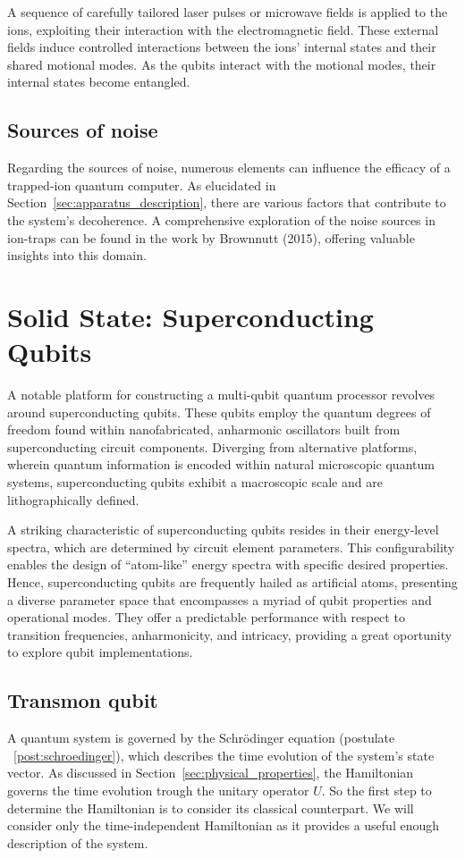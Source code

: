 \documentclass[
  journal=largetwo,
  year=2023,
]{cup-journal}
\begin{document}
A sequence of carefully tailored laser pulses or microwave fields is applied to the ions, exploiting their interaction with the electromagnetic field. These external fields induce controlled interactions between the ions' internal states and their shared motional modes.
As the qubits interact with the motional modes, their internal states become entangled.

\subsection{Sources of noise}

Regarding the sources of noise, numerous elements can influence the efficacy of a trapped-ion quantum computer. As elucidated in Section~\ref{sec:apparatus_description}, there are various factors that contribute to the system's decoherence. A comprehensive exploration of the noise sources in ion-traps can be found in the work by Brownnutt (2015)\autocite{brownnutt_2015_iontrap}, offering valuable insights into this domain.

\section{Solid State: Superconducting Qubits}
\label{cap:superconductor}

A notable platform for constructing a multi-qubit quantum processor revolves around superconducting qubits. These qubits employ the quantum degrees of freedom found within nanofabricated, anharmonic oscillators built from superconducting circuit components. Diverging from alternative platforms, wherein quantum information is encoded within natural microscopic quantum systems, superconducting qubits exhibit a macroscopic scale and are lithographically defined.

A striking characteristic of superconducting qubits resides in their energy-level spectra, which are determined by circuit element parameters. This configurability enables the design of ``atom-like'' energy spectra with specific desired properties. Hence, superconducting qubits are frequently hailed as artificial atoms, presenting a diverse parameter space that encompasses a myriad of qubit properties and operational modes. They offer a predictable performance with respect to transition frequencies, anharmonicity, and intricacy, providing a great oportunity to explore qubit implementations.

\subsection{Transmon qubit}
A quantum system is governed by the Schrödinger equation (postulate ~\ref{post:schroedinger}), which describes the time evolution of the system's state vector. As discussed in Section~\ref{sec:physical_properties}, the Hamiltonian governs the time evolution trough the unitary operator \(U\). So the first step to determine the Hamiltonian is to consider its classical counterpart. We will consider only the time-independent Hamiltonian as it provides a useful enough description of the system.
\end{document}
